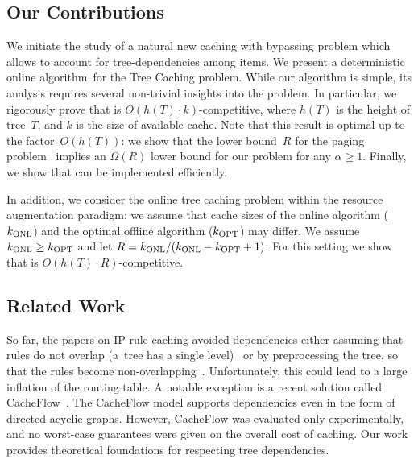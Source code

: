 \subsection{Our Contributions}

We initiate the study of a natural new caching with bypassing problem which
allows to account for tree-dependencies among items.
We present a deterministic online
algorithm~\ALG for the Tree Caching problem. While our algorithm is simple, its analysis
 requires several non-trivial
insights into the problem. In particular, we rigorously prove that \ALG is
$O(h(T)\cdot k)$-competitive, where $h(T)$ is the height of tree~$T$, and $k$ is the size of available cache.
Note that this
result is optimal up to the factor~$O(h(T))$: we show that the lower
bound~$R$ for the paging problem~\cite{competitive-analysis} implies an
$\Omega(R)$ lower bound for our problem for any $\alpha \geq 1$. Finally, we show that \ALG can be
implemented efficiently.

In addition, we consider the online tree caching problem within the resource
augmentation paradigm: we assume that cache sizes of the online algorithm
($k_\textnormal{ONL}$)  and the optimal offline algorithm ($k_\textnormal{OPT}$) may differ. We assume
$k_\textnormal{ONL} \geq k_\textnormal{OPT}$ and let $R = k_\textnormal{ONL}/(k_\textnormal{ONL}-k_\textnormal{OPT}+1)$.
For this setting we show that \ALG is
$O(h(T) \cdot R)$-competitive.



\subsection{Related Work}

So far, the papers on IP rule caching avoided dependencies either assuming
that rules do not overlap (a~tree has a single level)~\cite{route-caching-flat} 
or by preprocessing the tree, so that the rules become
non-overlapping~\cite{prefix-caching,fib-caching-non-overlapping}.
Unfortunately, this could lead to a large inflation of the routing table. A
notable exception is a recent solution called CacheFlow~\cite{cacheflow}. The
CacheFlow model supports dependencies even in the form of directed acyclic
graphs. However, CacheFlow was evaluated only experimentally, and no
worst-case guarantees were given on the overall cost of caching. Our work
provides theoretical foundations for respecting tree dependencies.


